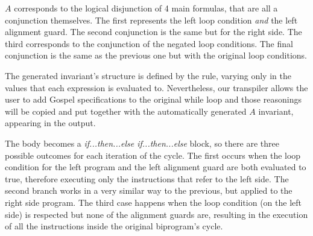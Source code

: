 $A$ corresponds to the logical disjunction of 4 main formulas, that are all a conjunction themselves.
The first represents the left loop condition \emph{and} the left alignment guard.
The second conjunction is the same but for the right side.
The third corresponds to the conjunction of the negated loop conditions.
The final conjunction is the same as the previous one but with the original loop conditions.

The generated invariant's structure is defined by the rule, varying only in the values that each expression is evaluated to.
Nevertheless, our transpiler allows the user to add Gospel specifications to the original while loop and those reasonings will be copied and put together with the automatically generated $A$ invariant, appearing in the output.

The body becomes a \emph{if...then...else if...then...else} block, so there are three possible outcomes for each iteration of the cycle.
The first occurs when the loop condition for the left program and the left alignment guard are both evaluated to true, therefore executing only the instructions that refer to the left side.
The second branch works in a very similar way to the previous, but applied to the right side program.
The third case happens when the loop condition (on the left side) is respected but none of the alignment guards are, resulting in the execution of all the instructions inside the original biprogram's cycle.

